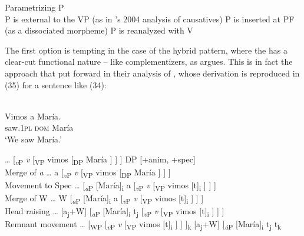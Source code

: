 \documentclass[output=paper]{langsci/langscibook}
\begin{document}
\ea%
    Parametrizing P\label{ex:gallego:33}\\
    \ea P is external to the VP (as in \citeauthor{Kayne2004}'s 2004 analysis of causatives)
    \ex P is inserted at PF (as a dissociated morpheme)
    \ex P is reanalyzed with V
\z
\z

The first option is tempting in the case of the hybrid pattern, where the  has a clear-cut functional nature – like complementizers, as \citet{Kayne2004} argues. This is in fact the approach that \citet{Ordóñez2016} put forward in their analysis of \DOM, whose derivation is reproduced in (35) for a sentence like (34):

\ea%
    \label{ex:gallego:34}\\
    \gll   Vimos     a          María.\\
           saw{}.\textsc{1pl}  \textsc{dom}   María\\
    \glt   ‘We saw María.’
\z
  
\ea
    \ea …  [\textit{\textsubscript{v}}\textsubscript{P}  \textit{v}  [\textsubscript{VP} vimos   [\textsubscript{DP} María ] ] ]    DP [+anim, +spec]\\
    Merge of \textit{a}
    \ex  …  a  [\textit{\textsubscript{v}}\textsubscript{P}  \textit{v}  [\textsubscript{VP} vimos   [\textsubscript{DP} María ] ] ]\\
    Movement to Spec 
    \ex  …  [\textit{\textsubscript{a}}\textsubscript{P} [María]\textsubscript{i}  a  [\textit{\textsubscript{v}}\textsubscript{P}  \textit{v}  [\textsubscript{VP} vimos [t]\textsubscript{i} ] ] ] \\
    Merge of W 
    \ex …  W [\textit{\textsubscript{a}}\textsubscript{P} [María]\textsubscript{i}  a  [\textit{\textsubscript{v}}\textsubscript{P}  \textit{v}  [\textsubscript{VP} vimos [t]\textsubscript{i} ] ] ]  \\
    Head raising 
    \ex …  [a\textsubscript{j}+W] [\textit{\textsubscript{a}}\textsubscript{P} [María]\textsubscript{i}  t\textsubscript{j}  [\textit{\textsubscript{v}}\textsubscript{P}  \textit{v}  [\textsubscript{VP} vimos [t]\textsubscript{i} ] ] ]  \\
    Remnant movement
    \ex …  [\textsubscript{WP}  [\textit{\textsubscript{v}}\textsubscript{P}  \textit{v}  [\textsubscript{VP} vimos [t]\textsubscript{i} ] ] ]\textsubscript{k} [a\textsubscript{j}+W] [\textit{\textsubscript{à}}\textsubscript{P} [María]\textsubscript{i}  t\textsubscript{j}  t\textsubscript{k}  
    \z
\z
\end{document}
